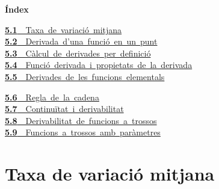 \documentclass[11pt,a4paper]{article}
\begin{document}
\begin{tcolorbox}[colback=fmsurface,colframe=fmsurface,arc=3mm,left=4mm,right=4mm,top=2mm,bottom=2mm]
\small\textbf{Índex}\par\smallskip
\begin{minipage}[t]{0.49\linewidth}\small \mbox{\hyperlink{sec1}{\textbf{\color{fmgreen}5.1}\ \ Taxa de variació mitjana}}\\[3pt]
\mbox{\hyperlink{sec2}{\textbf{\color{fmgreen}5.2}\ \ Derivada d'una funció en un punt}}\\[3pt]
\mbox{\hyperlink{sec3}{\textbf{\color{fmgreen}5.3}\ \ Càlcul de derivades per definició}}\\[3pt]
\mbox{\hyperlink{sec4}{\textbf{\color{fmgreen}5.4}\ \ Funció derivada i propietats de la derivada}}\\[3pt]
\mbox{\hyperlink{sec5}{\textbf{\color{fmgreen}5.5}\ \ Derivades de les funcions elementals}}\\[3pt]\end{minipage}\hfill\begin{minipage}[t]{0.49\linewidth}\small \mbox{\hyperlink{sec6}{\textbf{\color{fmgreen}5.6}\ \ Regla de la cadena}}\\[3pt]
\mbox{\hyperlink{sec7}{\textbf{\color{fmgreen}5.7}\ \ Continuïtat i derivabilitat}}\\[3pt]
\mbox{\hyperlink{sec8}{\textbf{\color{fmgreen}5.8}\ \ Derivabilitat de funcions a trossos}}\\[3pt]
\mbox{\hyperlink{sec9}{\textbf{\color{fmgreen}5.9}\ \ Funcions a trossos amb paràmetres}}\\[3pt]\end{minipage}
\end{tcolorbox}

\section{Taxa de variació mitjana}\hypertarget{sec1}{}

  
\end{document}
